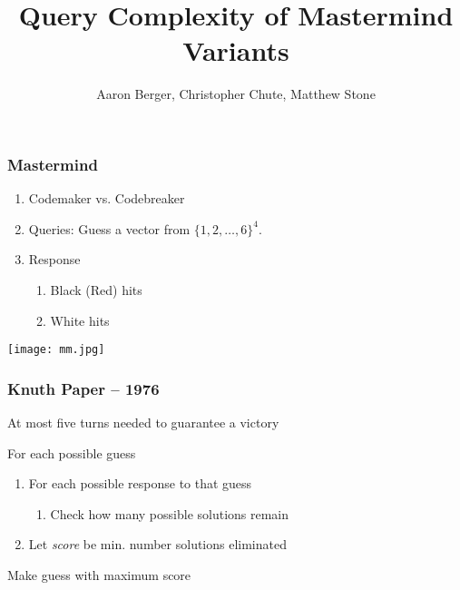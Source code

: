 \documentclass{beamer}
\title{Query Complexity of Mastermind Variants}
\author{Aaron Berger, Christopher Chute, Matthew Stone}
\begin{document}
    \begin{frame}
    	\maketitle
    \end{frame}

    \begin{frame}
    	\frametitle{Mastermind}
	   	\begin{enumerate}[label=\roman*.]
	    \item Codemaker vs. Codebreaker
	    \item Queries: Guess a vector from $\{1,2,\ldots,6\}^4$.	    		    
	    \item Response
	    	\begin{enumerate}[label=\roman*.]
			\item Black (Red) hits
			\item White hits
			\end{enumerate}
   	    \end{enumerate}
	\begin{center}
	\texttt{[image: mm.jpg]}
	\end{center}
    \end{frame}

    \begin{frame}
    	\frametitle{Knuth Paper -- 1976}
		At most five turns needed to guarantee a victory\vspace{\baselineskip}
		\begin{tcolorbox}[colback=green!5,colframe=green!40!black,title=Minimax]
		For each possible guess
			\begin{enumerate}[label=]
			\item For each possible response to that guess
				\begin{enumerate}[label=]
				\item Check how many possible solutions remain
				\end{enumerate}
			\item Let \textit{score} be min. number solutions eliminated
			\end{enumerate}
		Make guess with maximum score
		\end{tcolorbox}
    \end{frame}
 
\end{document}

